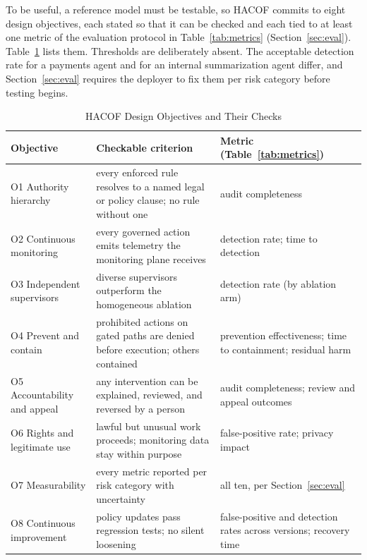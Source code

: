 \documentclass[journal]{IEEEtran}
\newcommand{\hacof}{HACOF}
\begin{document}
To be useful, a reference model must be testable, so \hacof{} commits to eight design objectives, each stated so that it can be checked and each tied to at least one metric of the evaluation protocol in Table~\ref{tab:metrics} (Section~\ref{sec:eval}). Table~\ref{tab:objectives} lists them. Thresholds are deliberately absent. The acceptable detection rate for a payments agent and for an internal summarization agent differ, and Section~\ref{sec:eval} requires the deployer to fix them per risk category before testing begins.

\begin{table}[!t]
\caption{\hacof{} Design Objectives and Their Checks}
\label{tab:objectives}
\centering
\footnotesize
\setlength{\tabcolsep}{3pt}
\begin{tabular}{>{\raggedright\arraybackslash}p{1.75cm}>{\raggedright\arraybackslash}p{3.15cm}>{\raggedright\arraybackslash}p{2.25cm}}
\toprule
\rowcolor{darkblue!15}
\textbf{Objective} & \textbf{Checkable criterion} & \textbf{Metric (Table~\ref{tab:metrics})} \\
\midrule
O1 Authority hierarchy & every enforced rule resolves to a named legal or policy clause; no rule without one & audit completeness \\
\rowcolor{darkblue!5}
O2 Continuous monitoring & every governed action emits telemetry the monitoring plane receives & detection rate; time to detection \\
O3 Independent supervisors & diverse supervisors outperform the homogeneous ablation & detection rate (by ablation arm) \\
\rowcolor{darkblue!5}
O4 Prevent and contain & prohibited actions on gated paths are denied before execution; others contained & prevention effectiveness; time to containment; residual harm \\
O5 Accountability and appeal & any intervention can be explained, reviewed, and reversed by a person & audit completeness; review and appeal outcomes \\
\rowcolor{darkblue!5}
O6 Rights and legitimate use & lawful but unusual work proceeds; monitoring data stay within purpose & false-positive rate; privacy impact \\
O7 Measurability & every metric reported per risk category with uncertainty & all ten, per Section~\ref{sec:eval} \\
\rowcolor{darkblue!5}
O8 Continuous improvement & policy updates pass regression tests; no silent loosening & false-positive and detection rates across versions; recovery time \\
\bottomrule
\end{tabular}
\end{table}
\end{document}
